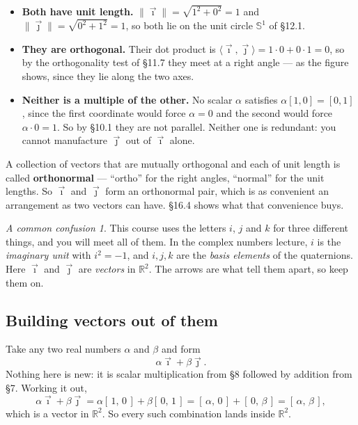 \documentclass[11pt]{article}
\theoremstyle{definition}
\theoremstyle{remark}
\newtheorem*{warn}{A common confusion}
\newcommand{\R}{\mathbb{R}}
\newcommand{\Sph}[1]{\mathbb{S}^{#1}}
\newcommand{\norm}[1]{\lVert #1\rVert}
\newcommand{\ivec}{\vec{\imath}}
\newcommand{\jvec}{\vec{\jmath}}
\begin{document}
\begin{itemize}[leftmargin=1.4em,itemsep=4pt]
  \item \textbf{Both have unit length.}
        $\norm{\ivec}=\sqrt{1^{2}+0^{2}}=1$ and
        $\norm{\jvec}=\sqrt{0^{2}+1^{2}}=1$, so both lie on the unit circle
        $\Sph{1}$ of \S12.1.
  \item \textbf{They are orthogonal.} Their dot product is
        $\langle\ivec,\jvec\rangle = 1\cdot 0 + 0\cdot 1 = 0$, so by the
        orthogonality test of \S11.7 they meet at a right angle --- as the
        figure shows, since they lie along the two axes.
  \item \textbf{Neither is a multiple of the other.} No scalar $\alpha$
        satisfies $\alpha[1,0]=[0,1]$, since the first coordinate would force
        $\alpha=0$ and the second would force $\alpha\cdot0=1$. So by \S10.1
        they are not parallel. Neither one is redundant: you cannot manufacture
        $\jvec$ out of $\ivec$ alone.
\end{itemize}

\noindent A collection of vectors that are mutually orthogonal and each of unit
length is called \textbf{orthonormal} --- ``ortho'' for the right angles,
``normal'' for the unit lengths. So $\ivec$ and $\jvec$ form an orthonormal
pair, which is as convenient an arrangement as two vectors can have. \S16.4
shows what that convenience buys.

\begin{warn}
This course uses the letters $i$, $j$ and $k$ for three different things, and
you will meet all of them. In the complex numbers lecture, $i$ is the
\emph{imaginary unit} with $i^{2}=-1$, and $i,j,k$ are the \emph{basis elements}
of the quaternions. Here $\ivec$ and $\jvec$ are \emph{vectors} in $\R^{2}$. The
arrows are what tell them apart, so keep them on.
\end{warn}

\subsection{Building vectors out of them}
Take any two real numbers $\alpha$ and $\beta$ and form
\[
  \alpha\ivec + \beta\jvec .
\]
Nothing here is new: it is scalar multiplication from \S8 followed by addition
from \S7. Working it out,
\[
  \alpha\ivec + \beta\jvec
  = \alpha[\,1,\,0\,] + \beta[\,0,\,1\,]
  = [\,\alpha,\,0\,] + [\,0,\,\beta\,]
  = [\,\alpha,\,\beta\,] ,
\]
which is a vector in $\R^{2}$. So every such combination lands inside $\R^{2}$.
\end{document}
